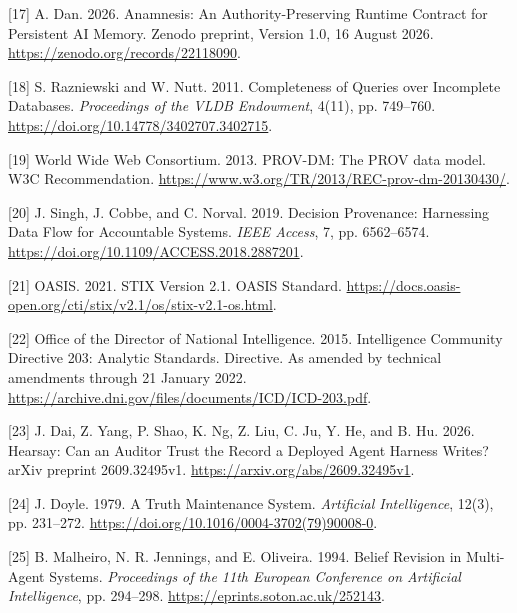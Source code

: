 \documentclass[
  11pt,
]{article}
\newlength{\cslhangindent}
\newlength{\cslentryspacingunit} %
\newenvironment{CSLReferences}[2] %
 {%
  \setlength{\parindent}{0pt}
  \ifodd #1
  \let\oldpar\par
  \def\par{\hangindent=\cslhangindent\oldpar}
  \fi
  \setlength{\parskip}{#2\cslentryspacingunit}
 }%
 {}
\begin{document}
\begin{CSLReferences}{1}{1}
\leavevmode{}%
{[}17{]} A. Dan. 2026. Anamnesis: An Authority-Preserving Runtime
Contract for Persistent AI Memory. Zenodo preprint, Version 1.0, 16
August 2026. \url{https://zenodo.org/records/22118090}.

\leavevmode{}%
{[}18{]} S. Razniewski and W. Nutt. 2011. Completeness of Queries over
Incomplete Databases. \emph{Proceedings of the VLDB Endowment}, 4(11),
pp. 749--760. \url{https://doi.org/10.14778/3402707.3402715}.

\leavevmode{}%
{[}19{]} World Wide Web Consortium. 2013. PROV-DM: The PROV data model.
W3C Recommendation.
\url{https://www.w3.org/TR/2013/REC-prov-dm-20130430/}.

\leavevmode{}%
{[}20{]} J. Singh, J. Cobbe, and C. Norval. 2019. Decision Provenance:
Harnessing Data Flow for Accountable Systems. \emph{IEEE Access}, 7, pp.
6562--6574. \url{https://doi.org/10.1109/ACCESS.2018.2887201}.

\leavevmode{}%
{[}21{]} OASIS. 2021. STIX Version 2.1. OASIS Standard.
\url{https://docs.oasis-open.org/cti/stix/v2.1/os/stix-v2.1-os.html}.

\leavevmode{}%
{[}22{]} Office of the Director of National Intelligence. 2015.
Intelligence Community Directive 203: Analytic Standards. Directive. As
amended by technical amendments through 21 January 2022.
\url{https://archive.dni.gov/files/documents/ICD/ICD-203.pdf}.

\leavevmode{}%
{[}23{]} J. Dai, Z. Yang, P. Shao, K. Ng, Z. Liu, C. Ju, Y. He, and B.
Hu. 2026. Hearsay: Can an Auditor Trust the Record a Deployed Agent
Harness Writes? arXiv preprint 2609.32495v1.
\url{https://arxiv.org/abs/2609.32495v1}.

\leavevmode{}%
{[}24{]} J. Doyle. 1979. A Truth Maintenance System. \emph{Artificial
Intelligence}, 12(3), pp. 231--272.
\url{https://doi.org/10.1016/0004-3702(79)90008-0}.

\leavevmode{}%
{[}25{]} B. Malheiro, N. R. Jennings, and E. Oliveira. 1994. Belief
Revision in Multi-Agent Systems. \emph{Proceedings of the 11th European
Conference on Artificial Intelligence}, pp. 294--298.
\url{https://eprints.soton.ac.uk/252143}.


\end{CSLReferences}
\end{document}
